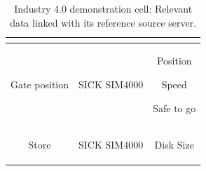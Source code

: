 \documentclass[5p,times,procedia]{elsarticle}
\begin{document}
\begin{table}
\begin{adjustbox}{width=.45\textwidth}
\begin{tabular}{ c c c }
\begin{minipage}[t]{0.2\textwidth}
\begin{description}
                     \end{description}
                     \end{minipage} \\ \hline
              Gate position        & SICK SIM4000      & \begin{minipage}[t]{0.2\textwidth}
              \begin{description}
                     \item Position
                     \item Speed
                     \item Safe to go
                     \end{description}
                     \end{minipage} \\ \hline
              Store       & SICK SIM4000      & \begin{minipage}[t]{0.2\textwidth}
                     \begin{description}
                     \item Disk Size
                     \end{description}
                   \end{minipage} \\ \bottomrule
       \end{tabular}
       \end{adjustbox}
       \caption{Industry 4.0 demonstration cell: Relevant data linked with its reference source server.}
       \label{tab:data_source}
\end{table}
\end{document}
